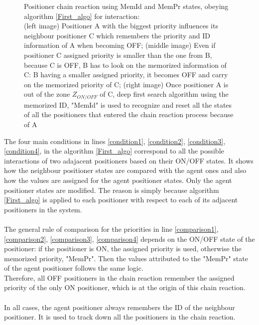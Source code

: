 \documentclass[]{spie}  %
\begin{document}
\begin{figure}[H]
\begin{minipage}[t]{5.4cm}
 			\label{ID_PR2}
 		\end{minipage}
 		\caption{\centering Positioner chain reaction using MemId and MemPr states, obeying algorithm \ref{First_algo} for interaction:\\
 			(left image) Positioner A with the biggest priority influences its neighbour positioner C which remembers the priority and ID information of A when becoming OFF; (middle image) Even if positioner C assigned priority is smaller than the one from B, because C is OFF, B has to look on the memorized information of C: B having a smaller assigned priority, it becomes OFF and carry on the memorized priority of C; (right image) Once positioner A is out of the zone $Z_{ON/OFF}$ of C, deep first search algorithm using the memorized ID, "MemId" is used to recognize and reset all the states of all the positioners that entered the chain reaction process because of A }
 		\label{ID_PR}
 	\end{figure}
	   The four main conditions in lines \ref{condition1}, \ref{condition2}, \ref{condition3}, \ref{condition4}, in the algorithm \ref{First_algo} correspond to all the possible interactions of two adajacent positioners based on their ON/OFF states. It shows how the neighbour positioner states are compared with the agent ones and also how the values are assigned for the agent positioner states. Only the agent positioner states are modified. The reason is simply because algorithm \ref{First_algo} is applied to each positioner with respect to each of its adjacent positioners in the system.\\\\
	The general rule of comparison for the priorities in line \ref{comparison1}, \ref{comparison2}, \ref{comparison3}, \ref{comparison4} depends on the ON/OFF state of the positioner: if the positioner is ON, the assigned priority is used, otherwise the memorized priority, "MemPr". Then the values attributed to the "MemPr" state of the agent positioner follows the same logic.\\
	Therefore, all OFF positioners in the chain reaction remember the assigned priority of the only ON positioner, which is at the origin of this chain reaction.\\\\	
	In all cases, the agent positioner always remembers the ID of the neighbour positioner. It is used to track down all the positioners in the chain reaction.   
\end{document}
